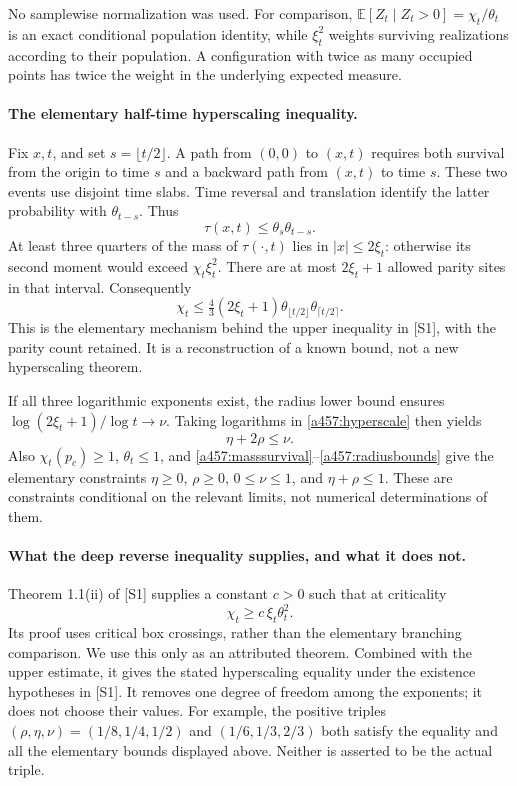 \documentclass[11pt]{article}
\begin{document}
No samplewise normalization was used. For comparison,
$\mathbb E[Z_t\mid Z_t>0]=\chi_t/\theta_t$ is an exact conditional
population identity, while $\xi_t^2$ weights surviving realizations
according to their population. A configuration with twice as many
occupied points has twice the weight in the underlying expected measure.

\paragraph{The elementary half-time hyperscaling inequality.}
Fix $x,t$, and set $s=\lfloor t/2\rfloor$. A path from $(0,0)$ to
$(x,t)$ requires both survival from the origin to time $s$ and a backward
path from $(x,t)$ to time $s$. These two events use disjoint time slabs.
Time reversal and translation identify the latter probability with
$\theta_{t-s}$. Thus
\begin{equation}\label{a457:pointcap}
 \tau(x,t)\le\theta_s\theta_{t-s}.
\end{equation}
At least three quarters of the mass of $\tau(\cdot,t)$ lies in
$|x|\le2\xi_t$: otherwise its second moment would exceed
$\chi_t\xi_t^2$. There are at most $2\xi_t+1$ allowed parity sites in
that interval. Consequently
\begin{equation}\label{a457:hyperscale}
 \chi_t\le\tfrac43(2\xi_t+1)\theta_{\lfloor t/2\rfloor}
                                      \theta_{\lceil t/2\rceil}.
\end{equation}
This is the elementary mechanism behind the upper inequality in [S1],
with the parity count retained. It is a reconstruction of a known bound,
not a new hyperscaling theorem.

If all three logarithmic exponents exist, the radius lower bound ensures
$\log(2\xi_t+1)/\log t\to\nu$. Taking logarithms in
\eqref{a457:hyperscale} then yields
\[
 \eta+2\rho\le\nu.
\]
Also $\chi_t(p_c)\ge1$, $\theta_t\le1$, and
\eqref{a457:masssurvival}--\eqref{a457:radiusbounds} give the elementary
constraints $\eta\ge0$, $\rho\ge0$, $0\le\nu\le1$, and
$\eta+\rho\le1$. These are constraints conditional on the relevant
limits, not numerical determinations of them.

\paragraph{What the deep reverse inequality supplies, and what it does not.}
Theorem 1.1(ii) of [S1] supplies a constant $c>0$ such that at criticality
\[
 \chi_t\ge c\,\xi_t\theta_t^2.
\]
Its proof uses critical box crossings, rather than the elementary
branching comparison. We use this only as an attributed theorem. Combined
with the upper estimate, it gives the stated hyperscaling equality under
the existence hypotheses in [S1]. It removes one degree of freedom among
the exponents; it does not choose their values. For example, the positive
triples $(\rho,\eta,\nu)=(1/8,1/4,1/2)$ and
$(1/6,1/3,2/3)$ both satisfy the equality and all the elementary bounds
displayed above. Neither is asserted to be the actual triple.
\end{document}
